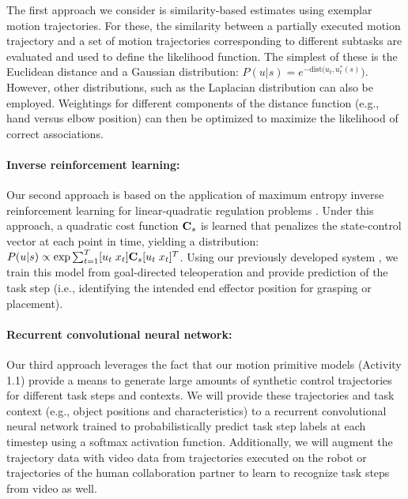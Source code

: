 \documentclass[letterpaper, 11 pt, onecolumn]{article}
\begin{document}
The first approach we consider is similarity-based estimates using exemplar motion trajectories. For these, the similarity between a partially executed motion trajectory and a set of motion trajectories corresponding to different subtasks are evaluated and used to define the likelihood function. The simplest of these is the Euclidean distance and a Gaussian distribution: $P(u|s) = e^{-\text{dist}(u_t,u_t^*(s)})$.
However, other distributions, such as the Laplacian distribution can also be employed. Weightings for different components of the distance function (e.g., hand versus elbow position) can then be optimized to maximize the likelihood of correct associations.

\paragraph{Inverse reinforcement learning:}

Our second approach is based on the application of maximum entropy inverse reinforcement learning for linear-quadratic regulation problems \cite{ziebart2010modeling}. Under this approach, a quadratic cost function ${\bf C}_s$ is learned that penalizes the state-control vector at each point in time, yielding a distribution: $P(u|s) \propto \exp{\sum_{t=1}^T [u_t \; x_t] {\bf C}_s [u_t \; x_t]^T}$. Using our previously developed system \cite{monfort2015intent,schultz2017goal}, we train this model from goal-directed teleoperation and provide prediction of the task step (i.e., identifying the intended end effector position for grasping or placement).

\paragraph{Recurrent convolutional neural network: }

Our third approach leverages the fact that our motion primitive models (Activity 1.1) provide a means to generate large amounts of synthetic control trajectories for different task steps and contexts. 
We will provide these trajectories and task context (e.g., object positions and characteristics) to a recurrent convolutional neural network \cite{veeriah2015differential} trained to probabilistically predict task step labels at each timestep using a softmax activation function. Additionally, we will augment the trajectory data with video data from trajectories executed on the robot or trajectories of the human collaboration partner to learn to recognize task steps from video as well.
\end{document}
